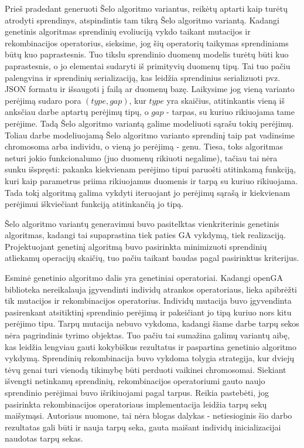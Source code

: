\documentclass{VUMIFInfKursinis}
\begin{document}
Prieš pradedant generuoti Šelo algoritmo variantus, reikėtų aptarti kaip turėtų atrodyti sprendinys, atspindintis tam tikrą Šelo algoritmo variantą.
Kadangi genetinis algoritmas sprendinių evoliuciją vykdo taikant mutacijos ir rekombinacijos operatorius, sieksime, jog šių operatorių taikymas sprendiniams būtų kuo paprastesnis.
Tuo tikslu sprendinio duomenų modelis turėtų būti kuo paprastesnis, o jo elementai sudaryti iš primityvių duomenų tipų.
Tai tuo pačiu palengvina ir sprendinių serializaciją, kas leidžia sprendinius serializuoti pvz.
JSON formatu ir išsaugoti į failą ar duomenų bazę.
Laikysime jog vieną varianto perėjimą sudaro pora $(type, gap)$, kur $type$ yra skaičius, atitinkantis vieną iš anksčiau darbe aptartų perėjimų tipų,
o $gap$ - tarpas, su kuriuo rikiuojama tame perėjime.
Tadą Šelo algoritmo variantą galime modeliuoti sąrašu tokių perėjimų.
Toliau darbe modeliuojamą Šelo algoritmo varianto sprendinį taip pat vadinsime chromosoma arba individu, o vieną jo perėjimą - genu. 
Tiesa, toks algoritmas neturi jokio funkcionalumo (juo duomenų rikiuoti negalime), tačiau tai nėra sunku išspręsti: pakanka kiekvienam perėjimo tipui
paruošti atitinkamą funkciją, kuri kaip parametrus priima rikiuojamus duomenis ir tarpą su kuriuo rikiuojama.
Tada tokį algoritmą galima vykdyti iteruojant jo perėjimų sąrašą ir kiekvienam perėjimui iškviečiant funkciją atitinkančią jo tipą.

Šelo algoritmo variantų generavimui buvo pasitelktas vienkriterinis genetinis algoritmas,
kadangi tai supaprastina tiek paties GA vykdymą, tiek realizaciją.
Projektuojant genetinį algoritmą buvo pasirinkta minimizuoti sprendinių atliekamų operacijų skaičių,
tuo pačiu taikant baudas pagal pasirinktus kriterijus.

Esminė genetinio algoritmo dalis yra genetiniai operatoriai.
Kadangi openGA biblioteka nereikalauja įgyvendinti individų atrankos operatoriaus, lieka apibrėžti tik mutacijos ir rekombinacijos operatorius.
Individų mutacija buvo įgyvendinta pasirenkant atsitiktinį sprendinio perėjimą ir pakeičiant jo tipą kuriuo nors kitu perėjimo tipu.
Tarpų mutacija nebuvo vykdoma, kadangi šiame darbe tarpų sekos nėra pagrindinis tyrimo objektas.
Tuo pačiu tai sumažina galimų variantų aibę, kas leidžia lengviau gauti kokybiškus rezultatus ir paspartina genetinio algoritmo vykdymą.
Sprendinių rekombinacija buvo vykdoma tolygia strategija, kur dviejų tėvų genai turi vienodą tikimybę
būti perduoti vaikinei chromosomai.
Siekiant išvengti netinkamų sprendinių, rekombinacijos operatoriumi gauto naujo sprendinio perėjimai buvo išrikiuojami pagal tarpus.
Reikia pastebėti, jog pasirinkta rekombinacijos operatoriaus implementacija leidžia tarpų sekų maišymąsi.
Autoriaus nuomone, tai nėra blogas dalykas - netiesioginis šio darbo rezultatas gali būti ir nauja tarpų seka, gauta maišant
individų inicializacijai naudotas tarpų sekas.
\end{document}
